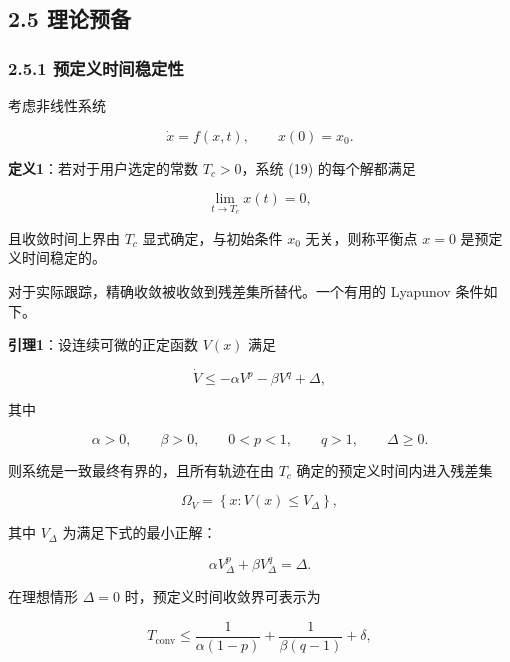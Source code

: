 \documentclass{article}
\begin{document}
\subsection{2.5 理论预备}

\subsubsection{2.5.1 预定义时间稳定性}

考虑非线性系统

\begin{equation}
\dot x=f(x,t),\qquad x(0)=x_0. \tag{19}
\end{equation}

\textbf{定义1}：若对于用户选定的常数 $T_c>0$，系统 (19) 的每个解都满足

\begin{equation}
\lim_{t\rightarrow T_c}x(t)=0, \tag{20}
\end{equation}

且收敛时间上界由 $T_c$ 显式确定，与初始条件 $x_0$ 无关，则称平衡点 $x=0$ 是预定义时间稳定的。

对于实际跟踪，精确收敛被收敛到残差集所替代。一个有用的 Lyapunov 条件如下。

\textbf{引理1}：设连续可微的正定函数 $V(x)$ 满足

\begin{equation}
\dot V\leq-\alpha V^{p}-\beta V^{q}+\Delta, \tag{21}
\end{equation}

其中

\begin{equation*}
\alpha>0,\qquad \beta>0,\qquad 0<p<1,\qquad q>1,\qquad \Delta\geq 0.
\end{equation*}

则系统是一致最终有界的，且所有轨迹在由 $T_c$ 确定的预定义时间内进入残差集

\begin{equation}
\Omega_V=\left\{x:V(x)\leq V_\Delta\right\}, \tag{22}
\end{equation}

其中 $V_\Delta$ 为满足下式的最小正解：

\begin{equation}
\alpha V_\Delta^{p}+\beta V_\Delta^{q}=\Delta. \tag{23}
\end{equation}

在理想情形 $\Delta=0$ 时，预定义时间收敛界可表示为

\begin{equation}
T_{\mathrm{conv}}\leq\frac{1}{\alpha(1-p)}+\frac{1}{\beta(q-1)}+\delta, \tag{24}
\end{equation}
\end{document}
